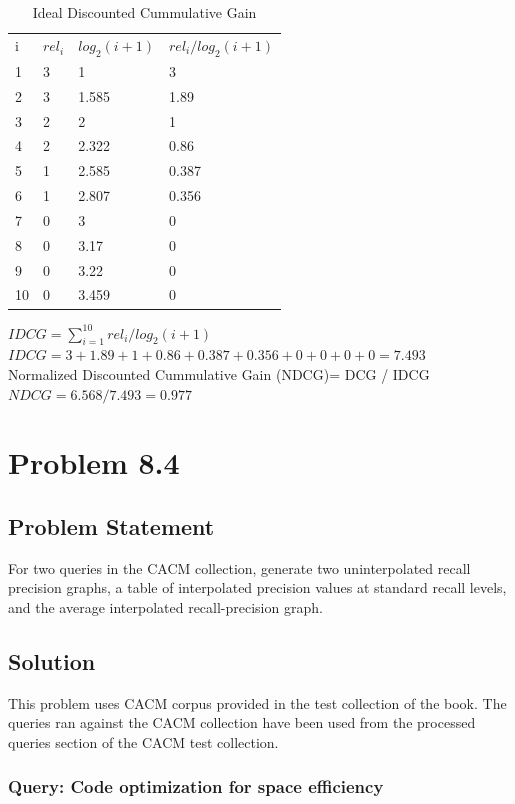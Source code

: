 \documentclass[12pt]{report}
\begin{document}
\begin{table}[]
\centering
\caption{Ideal Discounted Cummulative Gain}
\label{my-label}
\begin{tabular}{llll}
i & $rel_i$ & $log_2(i + 1)$   & $rel_i / log_2(i + 1)$  \\
1 & 3        & 1     		    & 3    \\
2 & 3        & 1.585 		    & 1.89 \\
3 & 2        & 2     		    & 1  \\
4 & 2        & 2.322 		    & 0.86 \\
5 & 1        & 2.585 		    & 0.387 \\ 
6 & 1        & 2.807     	    & 0.356    \\
7 & 0        & 3 		    & 0 \\
8 & 0        & 3.17    		    & 0  \\
9 & 0        & 3.22 		    & 0 \\
10 & 0      & 3.459 		    & 0 \\ 
\end{tabular}
\end{table}
$IDCG = \sum\limits_{i=1}^{10} rel_i / log_2(i + 1)$ \\
$IDCG = 3 + 1.89 + 1 + 0.86 + 0.387 + 0.356 + 0 + 0 + 0 + 0 =  7.493$\\
Normalized Discounted Cummulative Gain (NDCG)=  DCG / IDCG\\
$NDCG = 6.568 / 7.493 = 0.977$

\chapter{Problem 8.4}
\section{Problem Statement}
For two queries in the CACM collection, generate two uninterpolated recall precision graphs, a table of interpolated precision values at standard recall levels, and the average interpolated recall-precision graph.
\section{Solution}
This problem uses CACM corpus provided in the test collection of the book. The queries ran against the CACM collection have been used from the processed queries section of the CACM test collection.\\
\subsection{Query: Code optimization for space efficiency}
\end{document}
